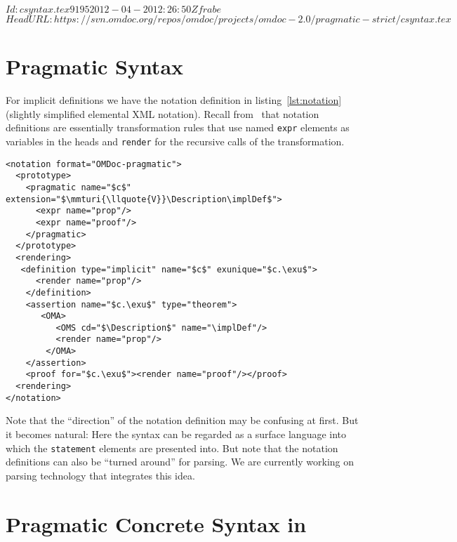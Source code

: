 \svnInfo $Id: csyntax.tex 9195 2012-04-20 12:26:50Z frabe $
\svnKeyword $HeadURL: https://svn.omdoc.org/repos/omdoc/projects/omdoc-2.0/pragmatic-strict/csyntax.tex $

\section{Pragmatic {\omdoc} Syntax}\label{sec:omdoc-pragmatic}

For implicit definitions we have the notation definition in listing~\ref{lst:notation}
(slightly simplified elemental XML notation). Recall from~\cite{KMR:presentation:08} that notation
definitions are essentially transformation rules that use named \lstinline|expr| elements
as variables in the heads and \lstinline|render| for the recursive calls of the
transformation.
\begin{lstlisting}[mathescape,label=lst:notation,morekeywords={pragmatic},
  caption=A Notation Definition for implicit Definitions]
<notation format="OMDoc-pragmatic">
  <prototype>
    <pragmatic name="$c$" extension="$\mmturi{\llquote{V}}\Description\implDef$">
      <expr name="prop"/>
      <expr name="proof"/>
    </pragmatic>
  </prototype>
  <rendering> 
   <definition type="implicit" name="$c$" exunique="$c.\exu$">
      <render name="prop"/>   
    </definition>
    <assertion name="$c.\exu$" type="theorem">
       <OMA>
          <OMS cd="$\Description$" name="\implDef"/>
          <render name="prop"/>
        </OMA>
    </assertion>
    <proof for="$c.\exu$"><render name="proof"/></proof>
  <rendering>
</notation>
\end{lstlisting}
Note that the ``direction'' of the notation definition may be confusing at first. But it
becomes natural: Here the  syntax can be regarded as a surface language into
which the \lstinline{statement} elements are presented into. But note that the notation
definitions can also be ``turned around'' for parsing. We are currently working on parsing
technology that integrates this idea.

\section{Pragmatic Concrete Syntax in \protect\sTeX}\label{sec:stex-pragmatic}

